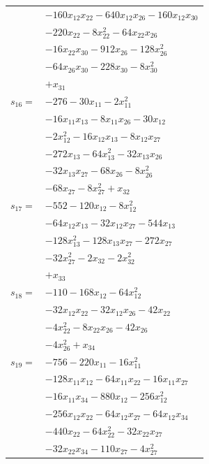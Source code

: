 \begin{longtable}{@{}r@{\;}l@{}}
 & \(\displaystyle -160x_{12}x_{22} -640x_{12}x_{26} -160x_{12}x_{30}\) \\
 & \(\displaystyle -220x_{22} -8x_{22}^{2} -64x_{22}x_{26}\) \\
 & \(\displaystyle -16x_{22}x_{30} -912x_{26} -128x_{26}^{2}\) \\
 & \(\displaystyle -64x_{26}x_{30} -228x_{30} -8x_{30}^{2}\) \\
 & \(\displaystyle +x_{31}\) \\[3pt]
\(s_{16}=\) & \(\displaystyle -276 -30x_{11} -2x_{11}^{2}\) \\
 & \(\displaystyle -16x_{11}x_{13} -8x_{11}x_{26} -30x_{12}\) \\
 & \(\displaystyle -2x_{12}^{2} -16x_{12}x_{13} -8x_{12}x_{27}\) \\
 & \(\displaystyle -272x_{13} -64x_{13}^{2} -32x_{13}x_{26}\) \\
 & \(\displaystyle -32x_{13}x_{27} -68x_{26} -8x_{26}^{2}\) \\
 & \(\displaystyle -68x_{27} -8x_{27}^{2} +x_{32}\) \\[3pt]
\(s_{17}=\) & \(\displaystyle -552 -120x_{12} -8x_{12}^{2}\) \\
 & \(\displaystyle -64x_{12}x_{13} -32x_{12}x_{27} -544x_{13}\) \\
 & \(\displaystyle -128x_{13}^{2} -128x_{13}x_{27} -272x_{27}\) \\
 & \(\displaystyle -32x_{27}^{2} -2x_{32} -2x_{32}^{2}\) \\
 & \(\displaystyle +x_{33}\) \\[3pt]
\(s_{18}=\) & \(\displaystyle -110 -168x_{12} -64x_{12}^{2}\) \\
 & \(\displaystyle -32x_{12}x_{22} -32x_{12}x_{26} -42x_{22}\) \\
 & \(\displaystyle -4x_{22}^{2} -8x_{22}x_{26} -42x_{26}\) \\
 & \(\displaystyle -4x_{26}^{2} +x_{34}\) \\[3pt]
\(s_{19}=\) & \(\displaystyle -756 -220x_{11} -16x_{11}^{2}\) \\
 & \(\displaystyle -128x_{11}x_{12} -64x_{11}x_{22} -16x_{11}x_{27}\) \\
 & \(\displaystyle -16x_{11}x_{34} -880x_{12} -256x_{12}^{2}\) \\
 & \(\displaystyle -256x_{12}x_{22} -64x_{12}x_{27} -64x_{12}x_{34}\) \\
 & \(\displaystyle -440x_{22} -64x_{22}^{2} -32x_{22}x_{27}\) \\
 & \(\displaystyle -32x_{22}x_{34} -110x_{27} -4x_{27}^{2}\) \\

\end{longtable}
